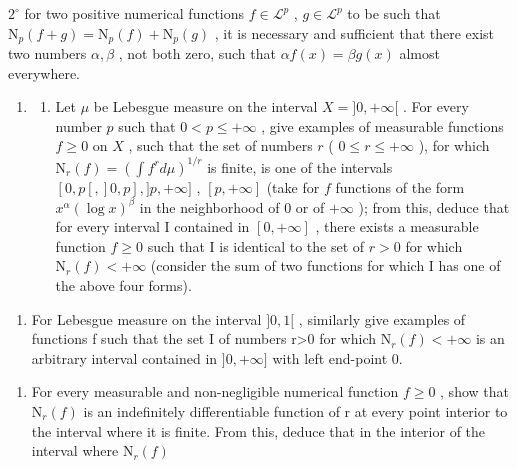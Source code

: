 \(2^{\circ}\) for two positive numerical functions \(f \in \mathcal{L}^{p}\) , \(g \in \mathcal{L}^{p}\) to be such that \(\mathrm{N}_{p}(f + g) = \mathrm{N}_{p}(f) + \mathrm{N}_{p}(g)\) , it is necessary and sufficient that there exist two numbers \(\alpha, \beta\) , not both zero, such that \(\alpha f(x) = \beta g(x)\) almost everywhere.

\begin{enumerate}
\def\labelenumi{\arabic{enumi})}
\setcounter{enumi}{4}
\tightlist
\item
  \begin{enumerate}
  \def\labelenumii{\alph{enumii})}
  \tightlist
  \item
    Let \(\mu\) be Lebesgue measure on the interval \(X = ]0, +\infty[\) . For every number \(p\) such that \(0 < p \leqslant +\infty\) , give examples of measurable functions \(f \geqslant 0\) on \(X\) , such that the set of numbers \(r\) ( \(0 \leqslant r \leqslant +\infty\) ), for which \(\mathrm{N}_r(f) = (\int f^r d\mu)^{1/r}\) is finite, is one of the intervals \([0, p[, ]0, p], ]p, +\infty]\) , \([p, +\infty]\) (take for \(f\) functions of the form \(x^\alpha(\log x)^\beta\) in the neighborhood of \(0\) or of \(+\infty\) ); from this, deduce that for every interval I contained in \([0, +\infty]\) , there exists a measurable function \(f \geqslant 0\) such that I is identical to the set of \(r > 0\) for which \(\mathrm{N}_r(f) < +\infty\) (consider the sum of two functions for which I has one of the above four forms).
  \end{enumerate}
\end{enumerate}

\begin{enumerate}
\def\labelenumi{\alph{enumi})}
\setcounter{enumi}{1}
\tightlist
\item
  For Lebesgue measure on the interval \(]0,1[\) , similarly give examples of functions f such that the set I of numbers r\textgreater0 for which \(\mathrm{N}_{r}(f)<+\infty\) is an arbitrary interval contained in \(]0,+\infty]\) with left end-point 0.
\end{enumerate}

\begin{enumerate}
\def\labelenumi{\arabic{enumi})}
\setcounter{enumi}{5}
\tightlist
\item
  For every measurable and non-negligible numerical function \(f \geqslant 0\) , show that \(\mathrm{N}_{r}(f)\) is an indefinitely differentiable function of r at every point interior to the interval where it is finite. From this, deduce that in the interior of the interval where \(\mathrm{N}_{r}(f)\)
\end{enumerate}

